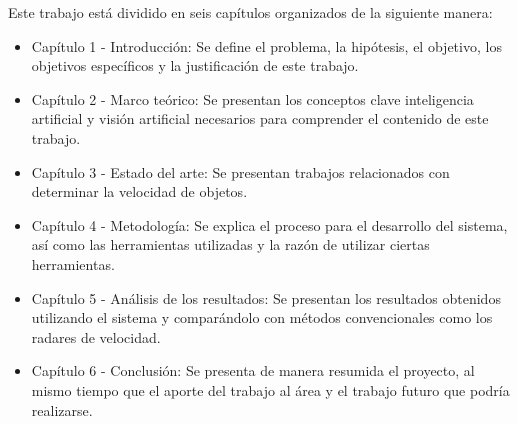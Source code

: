 Este trabajo está dividido en seis capítulos organizados de la siguiente manera:


\begin{itemize}
\item Capítulo 1 - Introducción: Se define el problema, la hipótesis, el objetivo, los objetivos específicos y la justificación de este trabajo.

\item Capítulo 2 - Marco teórico: Se presentan los conceptos clave inteligencia artificial y visión artificial necesarios para comprender el contenido de este trabajo.

\item Capítulo 3 - Estado del arte: Se presentan trabajos relacionados con determinar la velocidad de objetos.

\item Capítulo 4 - Metodología: Se explica el proceso para el desarrollo del sistema, así como las herramientas utilizadas y la razón de utilizar ciertas herramientas.

\item Capítulo 5 - Análisis de los resultados: Se presentan los resultados obtenidos utilizando el sistema y comparándolo con métodos convencionales como los radares de velocidad.

\item Capítulo 6 - Conclusión: Se presenta de manera resumida el proyecto, al mismo tiempo que el aporte del trabajo al área y el trabajo futuro que podría realizarse.
\end{itemize}
